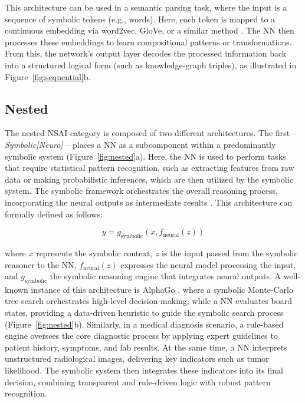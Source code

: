 \documentclass[12pt]{article}
\begin{document}
This architecture can be used in a semantic parsing task, where the input is a sequence of symbolic tokens (e.g., words). Here, each token is mapped to a continuous embedding via word2vec, GloVe, or a similar method \cite{mikolov2013efficient, pennington2014glove}. The NN then processes these embeddings to learn compositional patterns or transformations. From this, the network’s output layer decodes the processed information back into a structured logical form (such as knowledge-graph triples), as illustrated in Figure~\ref{fig:sequential}b.




\subsection{Nested}
The nested NSAI category is composed of two different architectures. The first -- \textit{Symbolic[Neuro]} -- places a NN as a subcomponent within a predominantly symbolic system (Figure~\ref{fig:nested}a). Here, the NN is used to perform tasks that require statistical pattern recognition, such as extracting features from raw data or making probabilistic inferences, which are then utilized by the symbolic system. The symbolic framework orchestrates the overall reasoning process, incorporating the neural outputs as intermediate results \cite{silver2016mastering}. This architecture can formally defined as follows:

\begin{equation}
y = g_\text{symbolic}(x, f_\text{neural}(z))  
\end{equation}

\noindent where $x$ represents the symbolic context, $z$ is the input passed from the symbolic reasoner to the NN, $f_\text{neural}(z)$ expresses the neural model processing the input, and $g_\text{symbolic}$  the symbolic reasoning engine that integrates neural outputs. A well-known instance of this architecture is AlphaGo \cite{silver2016mastering}, where a symbolic Monte-Carlo tree search orchestrates high-level decision-making, while a NN evaluates board states, providing a data-driven heuristic to guide the symbolic search process \cite{coulom2006efficient} (Figure~\ref{fig:nested}b). Similarly, in a medical diagnosis scenario, a rule-based engine oversees the core diagnostic process by applying expert guidelines to patient history, symptoms, and lab results. At the same time, a NN interprets unstructured radiological images, delivering key indicators such as tumor likelihood. The symbolic system then integrates these indicators into its final decision, combining transparent and rule-driven logic with robust pattern recognition.
\end{document}
